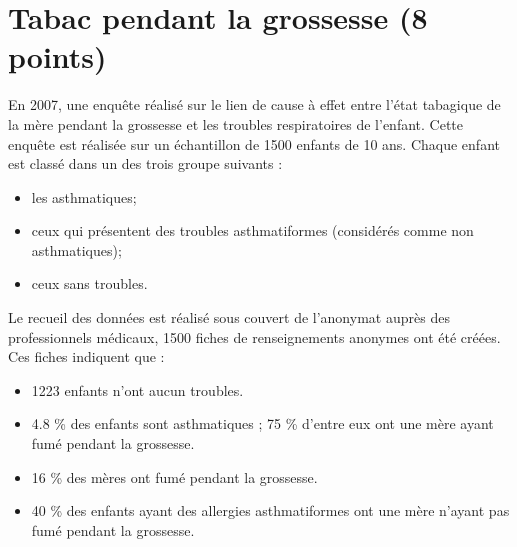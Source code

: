 \section{Tabac pendant la grossesse (8 points)}

En 2007, une enquête réalisé sur le lien de cause à effet entre l'état tabagique de la mère pendant la grossesse  et les troubles respiratoires de l'enfant. Cette enquête est réalisée sur un échantillon de 1500 enfants de 10 ans.
Chaque enfant est classé dans un des trois groupe suivants :
\begin{itemize}
	\item les asthmatiques;
	\item ceux qui présentent des troubles asthmatiformes (considérés comme non asthmatiques);
	\item ceux sans troubles.

\end{itemize}

Le recueil des données est réalisé sous couvert de l'anonymat auprès des professionnels médicaux, 1500 fiches de renseignements anonymes ont été créées.
Ces fiches indiquent que :

\begin{itemize}
	\item 1223 enfants n'ont aucun troubles.
	\item \num{4.8} \% des enfants sont asthmatiques ; 75 \% d'entre eux ont une mère ayant fumé pendant la grossesse.
	\item 16 \% des mères ont fumé pendant la grossesse.
	\item 40 \% des enfants ayant des allergies asthmatiformes ont une mère n'ayant pas fumé pendant la grossesse.
\end{itemize}

